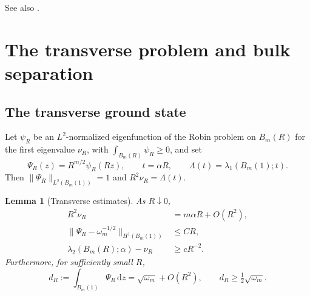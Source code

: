 \documentclass[11pt,a4paper]{article}
\numberwithin{equation}{section}
\theoremstyle{paperplain}
\newtheorem{lemma}[theorem]{Lemma}
\theoremstyle{remark}
\newcommand{\dd}{\,\mathrm d}
\begin{document}
See also \cite[Theorem~2.1 and the preceding discussion]{Laugesen}.

\section{The transverse problem and bulk separation}\label{sec:transverse}

\subsection{The transverse ground state}
Let $\psi_R$ be an $L^2$-normalized eigenfunction of the Robin problem on
$B_m(R)$ for the first eigenvalue $\nu_R$, with $\int_{B_m(R)}\psi_R\ge0$,
and set
\[
 \Psi_R(z)=R^{m/2}\psi_R(Rz),\qquad
 t=\alpha R,\qquad \Lambda(t)=\lambda_1(B_m(1);t).
\]
Then $\|\Psi_R\|_{L^2(B_m(1))}=1$ and $R^2\nu_R=\Lambda(t)$.

\begin{lemma}[Transverse estimates]\label{lem:transverse}
As $R\downarrow0$,
\begin{align}
 R^2\nu_R&=m\alpha R+O(R^2),\label{eq:nu-expansion}\\
 \|\Psi_R-\omega_m^{-1/2}\|_{H^1(B_m(1))}&\le CR,\label{eq:Psi-H1}\\
 \lambda_2(B_m(R);\alpha)-\nu_R&\ge cR^{-2}.\label{eq:transverse-gap}
\end{align}
Furthermore, for sufficiently small $R$,
\begin{equation}\label{eq:d-R}
 d_R:=\int_{B_m(1)}\Psi_R\dd z
 =\sqrt{\omega_m}+O(R^2),\qquad d_R\ge\tfrac12\sqrt{\omega_m}.
\end{equation}
\end{lemma}
\end{document}
